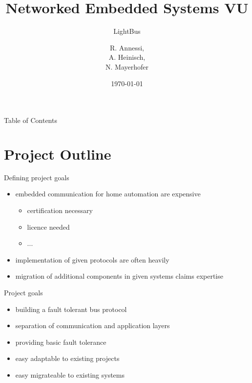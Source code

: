 \documentclass{beamer}
\title {Networked Embedded Systems VU}
\subtitle {LightBus}
\author{R. Annessi,\\ A. Heinisch,\\ N. Mayerhofer}
\date{\customdate\today}
\begin{document}
\begin{frame}
  \titlepage
\end{frame}
 \logo{}

\begin{frame}{Table of Contents}
  \tableofcontents
\end{frame}


\section{Project Outline}
\begin{frame}{Defining project goals}%
\begin{center}
\begin{itemize}
  \item embedded communication for home automation are expensive
    \begin{itemize}
      \item certification necessary
      \item licence needed
      \item ...
    \end{itemize}
  \item implementation of given protocols are often heavily
  \item migration of additional components in given systems claims expertise
\end{itemize}
\end{center}
\end{frame}

\begin{frame}{Project goals}%
\begin{center}
\begin{itemize}
 \item \begin{large}building a fault tolerant bus protocol\end{large}
 \item \begin{large}separation of communication and application layers\end{large}
 \item \begin{large}providing basic fault tolerance\end{large}
 \item \begin{large}easy adaptable to existing projects\end{large}
 \item \begin{large}easy migrateable to existing systems\end{large}
\end{itemize}
\end{center}
\end{frame}
\end{document}
